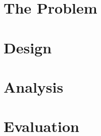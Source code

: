 \documentclass{report}
\begin{document}
\chapter{The Problem}

\chapter{Design}

\chapter{Analysis}

\chapter{Evaluation}
\end{document}
